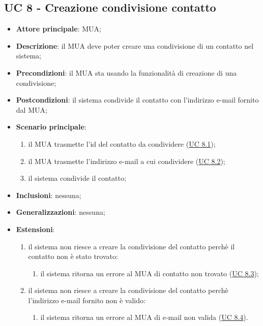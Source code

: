 \subsection{UC 8 - Creazione condivisione contatto} \label{sec:UC8}

    \begin{itemize}
        \item \textbf{Attore principale}: MUA;
        \item \textbf{Descrizione}: il MUA deve poter creare una condivisione di un contatto nel sistema;
        \item \textbf{Precondizioni}: il MUA sta usando la funzionalità di creazione di una condivisione;
        \item \textbf{Postcondizioni}: il sistema condivide il contatto con l'indirizzo e-mail fornito dal MUA;
        \item \textbf{Scenario principale}:
            \begin{enumerate}
                \item il MUA trasmette l'id del contatto da condividere (\hyperref[sec:UC8.1]{UC 8.1});
                \item il MUA trasmette l'indirizzo e-mail a cui condividere (\hyperref[sec:UC8.2]{UC 8.2});
                \item il sistema condivide il contatto;
            \end{enumerate}
        \item \textbf{Inclusioni}: nessuna;
        \item \textbf{Generalizzazioni}: nessuna;
        \item \textbf{Estensioni}:
        \begin{enumerate}[label=\alph*.]
            \item il sistema non riesce a creare la condivisione del contatto perchè il contatto non è stato trovato:
            \begin{enumerate}[label=\arabic*.]
                \item il sistema ritorna un errore al MUA di contatto non trovato (\hyperref[sec:UC8.3]{UC 8.3});
            \end{enumerate}
            \item il sistema non riesce a creare la condivisione del contatto perchè l'indirizzo e-mail fornito non è valido:
            \begin{enumerate}[label=\arabic*.]
                \item il sistema ritorna un errore al MUA di e-mail non valida (\hyperref[sec:UC8.4]{UC 8.4}).
            \end{enumerate}
        \end{enumerate}
    \end{itemize}


